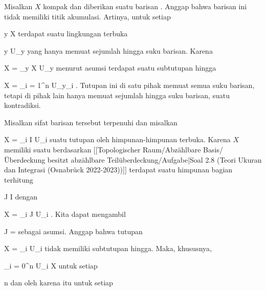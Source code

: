 {

\teilbeweis {}{}{}
{Misalkan $X$ kompak dan diberikan suatu barisan
.
Anggap bahwa barisan ini tidak memiliki titik akumulasi. Artinya, untuk setiap

\mavergleichskette
{\vergleichskette
{ y
}
{ \in }{ X
}
{  }{
}
{    }{
}
{   }{
}
}
{}{}{}
terdapat suatu lingkungan terbuka

\mavergleichskette
{\vergleichskette
{ y
}
{ \in }{ U_y
}
{  }{
}
{    }{
}
{   }{
}
}
{}{}{}
yang hanya memuat sejumlah hingga suku barisan. Karena

\mavergleichskettedisp
{\vergleichskette
{ X
}
{ =} { \bigcup_{y \in X} U_y
}
{ } {
}
{ } {
}
{ } {
}
}
{}{}{}
menurut asumsi terdapat suatu subtutupan hingga

\mavergleichskettedisp
{\vergleichskette
{ X
}
{ =} { \bigcup_{i = 1}^n U_{y_i }
}
{ } {
}
{ } {
}
{ } {
}
}
{}{}{.} Tutupan ini di satu pihak memuat semua suku barisan, tetapi di pihak lain hanya memuat sejumlah hingga suku barisan, suatu kontradiksi.}
{}

\teilbeweis {}{}{}
{Misalkan sifat barisan tersebut terpenuhi dan misalkan

\mavergleichskette
{\vergleichskette
{ X
}
{ = }{ \bigcup_{i \in I} U_i
}
{  }{
}
{    }{
}
{   }{
}
}
{}{}{}
suatu tutupan oleh himpunan-himpunan terbuka. Karena $X$ memiliki suatu
berdasarkan
[[Topologischer Raum/Abzählbare Basis/Überdeckung besitzt abzählbare Teilüberdeckung/Aufgabe|Soal 2.8 (Teori Ukuran dan Integrasi (Osnabrück 2022-2023))]]
terdapat suatu himpunan bagian terhitung

\mavergleichskette
{\vergleichskette
{ J
}
{ \subseteq }{ I
}
{  }{
}
{    }{
}
{   }{
}
}
{}{}{}
dengan

\mavergleichskettedisp
{\vergleichskette
{ X
}
{ =} { \bigcup_{i \in J} U_i
}
{ } {
}
{ } {
}
{ } {
}
}
{}{}{.}
Kita dapat mengambil

\mavergleichskette
{\vergleichskette
{ J
}
{ = }{ \N
}
{  }{
}
{    }{
}
{   }{
}
}
{}{}{}
sebagai asumsi. Anggap bahwa tutupan

\mavergleichskette
{\vergleichskette
{ X
}
{ = }{ \bigcup_{i \in \N} U_i
}
{  }{
}
{    }{
}
{   }{
}
}
{}{}{}
tidak memiliki subtutupan hingga. Maka, khususnya,

\mavergleichskette
{\vergleichskette
{ \bigcup_{i = 0}^n  U_i
}
{ \neq }{ X
}
{  }{
}
{    }{
}
{   }{
}
}
{}{}{}
untuk setiap

\mavergleichskette
{\vergleichskette
{ n
}
{ \in }{ \N
}
{  }{
}
{    }{
}
{   }{
}
}
{}{}{}
dan oleh karena itu untuk setiap

}}
